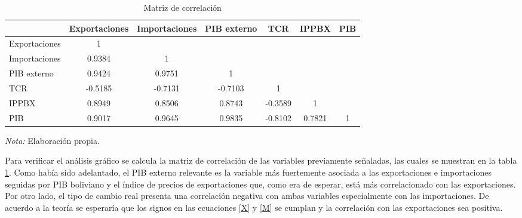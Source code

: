 \documentclass[12pt,letterpaper]{article}
\begin{document}
\begin{table}
\caption{Matriz de correlación}
\begin{center}
\begin{tabular}{lcccccc}									
\hline													
\hline												
	&	Exportaciones	&	Importaciones	&	PIB externo	&	TCR	&	IPPBX	&	PIB	\\
\hline													
Exportaciones	&	1	&		&		&		&		&		\\
Importaciones	&	0.9384	&	1	&		&		&		&		\\
PIB externo	&	0.9424	&	0.9751	&	1	&		&		&		\\
TCR	&	-0.5185	&	-0.7131	&	-0.7103	&	1	&		&		\\
IPPBX	&	0.8949	&	0.8506	&	0.8743	&	-0.3589	&	1	&		\\
PIB	&	0.9017	&	0.9645	&	0.9835	&	-0.8102	&	0.7821	&	1	\\
\hline													
\hline									
\end{tabular}	
\end{center}						
\begin{scriptsize}
\emph{Nota:} Elaboración propia.
\end{scriptsize}	
\label{corre}	
\end{table}	

Para verificar el análisis gráfico se calcula la matriz de correlación de las variables previamente señaladas, las cuales se muestran en la tabla \ref{corre}. Como había sido adelantado, el PIB externo relevante es la variable más fuertemente asociada a las exportaciones e importaciones seguidas por PIB boliviano y el índice de precios de exportaciones que, como era de esperar, está más correlacionado con las exportaciones. Por otro lado, el tipo de cambio real presenta una correlación negativa con ambas variables especialmente con las importaciones. De acuerdo a la teoría se esperaría que los signos en las ecuaciones \ref{X} y \ref{M} se cumplan y la correlación con las exportaciones sea positiva.
\end{document}
